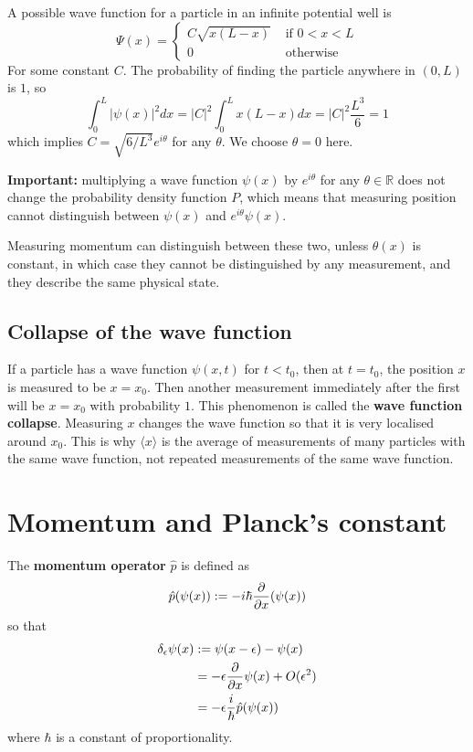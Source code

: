 \begin{example}
	A possible wave function for a particle in an infinite potential well is
	\[
		\Psi(x) = \begin{cases}
			C \sqrt{x(L - x)} & \text{ if } 0 < x < L \\
			0 & \text{ otherwise }
		\end{cases}
	\]
	For some constant $C$. The probability of finding the particle anywhere in $(0, L)$ is $1$, so
	\[
		\int_{0}^{L} |\psi(x)|^2 dx = |C|^2 \int_{0}^{L} x(L - x) dx = |C|^2 \frac{L^3}{6} = 1
	\]
	which implies $C = \sqrt{6 / L^3} e^{i \theta}$ for any $\theta$. We choose $\theta = 0$ here.
\end{example}

\begin{remark}
	\textbf{Important:} multiplying a wave function $\psi(x)$ by $e^{i \theta}$ for any $\theta \in \mathbb{R}$ does not change the probability density function $P$, which means that measuring position cannot distinguish between $\psi(x)$ and $e^{i \theta} \psi(x)$.
	
	Measuring momentum can distinguish between these two, unless $\theta(x)$ is constant, in which case they cannot be distinguished by any measurement, and they describe the same physical state.
\end{remark}

\subsection{Collapse of the wave function}

\begin{definition}
	If a particle has a wave function $\psi(x, t)$ for $t < t_0$, then at $t = t_0$, the position $x$ is measured to be $x = x_0$. Then another measurement immediately after the first will be $x = x_0$ with probability $1$. This phenomenon is called the \textbf{wave function collapse}. Measuring $x$ changes the wave function so that it is very localised around $x_0$. This is why $\langle x \rangle$ is the average of measurements of many particles with the same wave function, not repeated measurements of the same wave function.
\end{definition}

\section{Momentum and Planck's constant}

\begin{definition}
	The \textbf{momentum operator} $\hat{p}$ is defined as
	\[
		\hat{p} (\psi(x)) := -i \hbar \diffp{}{x} (\psi(x))
	\]
	so that
	\[
		\begin{aligned}
			\delta_{\epsilon} \psi(x)
				& := \psi(x - \epsilon) - \psi(x) \\
				& = -\epsilon \diffp{}{x} \psi(x) + O(\epsilon^2) \\
				& = -\epsilon \frac{i}{\hbar} \hat{p} (\psi(x))
		\end{aligned}
	\]
	where $\hbar$ is a constant of proportionality.
\end{definition}

